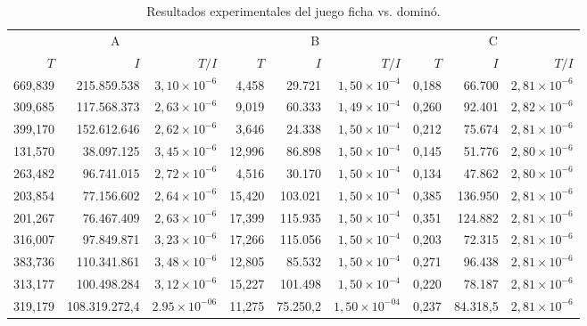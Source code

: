 \begin{table}[h]
    \centering
    \caption{Resultados experimentales del juego ficha vs. dominó.}
    \label{tab:resultados-domino}
    \scriptsize
    \begin{tabular}{r r r r r r r r r}
    \toprule
    \multicolumn{3}{c}{A} & \multicolumn{3}{c}{B} & \multicolumn{3}{c}{C} \\ \cmidrule(r){1-3} \cmidrule(lr){4-6} \cmidrule(l){7-9}
    $T$ & $I$ & $T/I$ & $T$ & $I$ & $T/I$ & $T$ & $I$ & $T/I$ \\ \cmidrule(r){1-3} \cmidrule(lr){4-6} \cmidrule(l){7-9}
	669,839 & 215.859.538   & $3,10 {\times} 10^{-6}$ &  4,458 &  29.721   & $1,50 {\times} 10^{-4}$ & 0,188 &  66.700   & $2,81 {\times} 10^{-6}$ \\
	309,685 & 117.568.373   & $2,63 {\times} 10^{-6}$ &  9,019 &  60.333   & $1,49 {\times} 10^{-4}$ & 0,260 &  92.401   & $2,82 {\times} 10^{-6}$ \\
	399,170 & 152.612.646   & $2,62 {\times} 10^{-6}$ &  3,646 &  24.338   & $1,50 {\times} 10^{-4}$ & 0,212 &  75.674   & $2,81 {\times} 10^{-6}$ \\
	131,570 &  38.097.125   & $3,45 {\times} 10^{-6}$ & 12,996 &  86.898   & $1,50 {\times} 10^{-4}$ & 0,145 &  51.776   & $2,80 {\times} 10^{-6}$ \\
	263,482 &  96.741.015   & $2,72 {\times} 10^{-6}$ &  4,516 &  30.170   & $1,50 {\times} 10^{-4}$ & 0,134 &  47.862   & $2,80 {\times} 10^{-6}$ \\
	203,854 &  77.156.602   & $2,64 {\times} 10^{-6}$ & 15,420 & 103.021   & $1,50 {\times} 10^{-4}$ & 0,385 & 136.950   & $2,81 {\times} 10^{-6}$ \\
	201,267 &  76.467.409   & $2,63 {\times} 10^{-6}$ & 17,399 & 115.935   & $1,50 {\times} 10^{-4}$ & 0,351 & 124.882   & $2,81 {\times} 10^{-6}$ \\
	316,007 &  97.849.871   & $3,23 {\times} 10^{-6}$ & 17,266 & 115.056   & $1,50 {\times} 10^{-4}$ & 0,203 &  72.315   & $2,81 {\times} 10^{-6}$ \\
	383,736 & 110.341.861   & $3,48 {\times} 10^{-6}$ & 12,805 &  85.532   & $1,50 {\times} 10^{-4}$ & 0,271 &  96.438   & $2,81 {\times} 10^{-6}$ \\
	313,177 & 100.498.284   & $3,12 {\times} 10^{-6}$ & 15,227 & 101.498   & $1,50 {\times} 10^{-4}$ & 0,220 &  78.187   & $2,81 {\times} 10^{-6}$ \\ \cmidrule(r){1-3} \cmidrule(lr){4-6} \cmidrule(l){7-9}
	319,179 & 108.319.272,4 & $2.95 {\times} 10^{-06}$ & 11,275 &  75.250,2 & $1,50 {\times} 10^{-04}$ & 0,237 &  84.318,5 & $2,81 {\times} 10^{-6}$ \\ \bottomrule
    \end{tabular}
\end{table}


